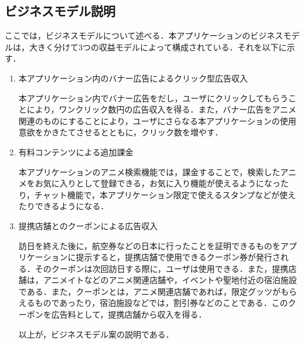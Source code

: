 \subsection{ビジネスモデル説明}
\par
 ここでは，ビジネスモデルについて述べる．本アプリケーションのビジネスモデルは，大きく分けて3つの収益モデルによって構成されている．それを以下に示す．
\begin{enumerate}
\item 本アプリケーション内のバナー広告によるクリック型広告収入
\par 
本アプリケーション内でバナー広告をだし，ユーザにクリックしてもらうことにより，ワンクリック数円の広告収入を得る．また，バナー広告をアニメ関連のものにすることにより，ユーザにさらなる本アプリケーションの使用意欲をかきたてさせるとともに，クリック数を増やす．
\item 有料コンテンツによる追加課金 
\par
 本アプリケーションのアニメ検索機能では，課金することで，検索したアニメをお気に入りとして登録できる，お気に入り機能が使えるようになったり，チャット機能で，本アプリケーション限定で使えるスタンプなどが使えたりできるようになる．
\item 提携店舗とのクーポンによる広告収入
\par
 訪日を終えた後に，航空券などの日本に行ったことを証明できるものをアプリケーションに提示すると，提携店舗で使用できるクーポン券が発行される．そのクーポンは次回訪日する際に，ユーザは使用できる．また，提携店舗は，アニメイトなどのアニメ関連店舗や，イベントや聖地付近の宿泊施設である．また，クーポンとは，アニメ関連店舗であれば，限定グッツがもらえるものであったり，宿泊施設などでは，割引券などのことである．このクーポンを広告料として，提携店舗から収入を得る．
\par
以上が，ビジネスモデル案の説明である．
\end{enumerate}
